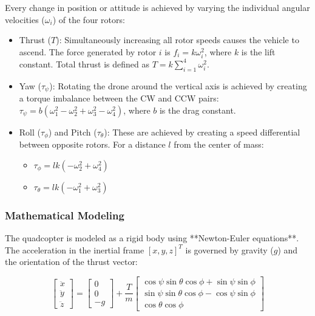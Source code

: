 Every change in position or attitude is achieved by varying the individual angular velocities ($\omega_i$) of the four rotors:

\begin{itemize}
    \item Thrust ($T$): Simultaneously increasing all rotor speeds causes the vehicle to ascend. The force generated by rotor $i$ is $f_i = k\omega_i^2$, where $k$ is the lift constant. Total thrust is defined as $T = k\sum_{i=1}^4\omega_i^2$.
    \item Yaw ($\tau_\psi$): Rotating the drone around the vertical axis is achieved by creating a torque imbalance between the CW and CCW pairs: $\tau_\psi = b (\omega_1^2 - \omega_2^2 + \omega_3^2 - \omega_4^2)$, where $b$ is the drag constant.
    \item Roll ($\tau_\phi$) and Pitch ($\tau_\theta$): These are achieved by creating a speed differential between opposite rotors. For a distance $l$ from the center of mass:
        \begin{itemize}
            \item $\tau_\phi = l k (-\omega_2^2 + \omega_4^2)$
            \item  $\tau_\theta = l k (-\omega_1^2 + \omega_3^2)$
        \end{itemize}
\end{itemize}

\subsubsection{Mathematical Modeling}

The quadcopter is modeled as a rigid body using **Newton-Euler equations**. The acceleration in the inertial frame $[x,y,z]^T$ is governed by gravity ($g$) and the orientation of the thrust vector:

$$\begin{bmatrix} \ddot{x} \\ \ddot{y} \\ \ddot{z} \end{bmatrix} = \begin{bmatrix} 0 \\ 0 \\ -g \end{bmatrix} + \frac{T}{m} \begin{bmatrix} \cos\psi \sin\theta \cos\phi + \sin\psi \sin\phi \\ \sin\psi \sin\theta \cos\phi - \cos\psi \sin\phi \\ \cos\theta \cos\phi \end{bmatrix}$$

